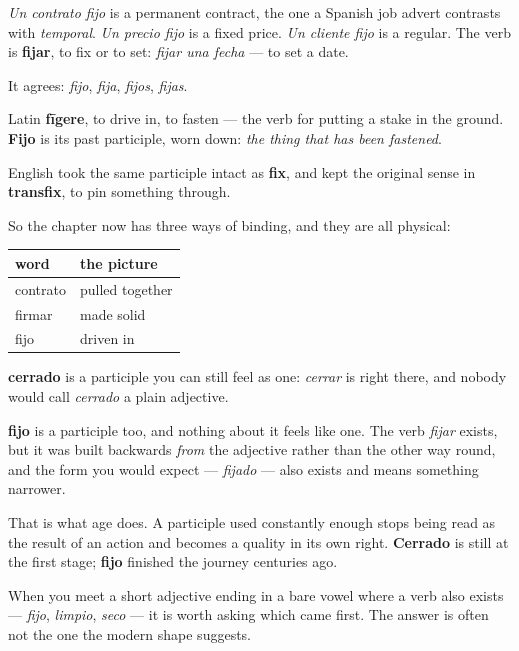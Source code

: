 \emph{Un contrato fijo} is a permanent contract, the one a Spanish job advert contrasts with \emph{temporal}. \emph{Un precio fijo} is a fixed price. \emph{Un cliente fijo} is a regular. The verb is \textbf{fijar}, to fix or to set: \emph{fijar una fecha} — to set a date.

It agrees: \emph{fijo}, \emph{fija}, \emph{fijos}, \emph{fijas}.

\begin{cousinweb}
Latin \textbf{fīgere}, to drive in, to fasten — the verb for putting a stake in the ground. \textbf{Fijo} is its past participle, worn down: \emph{the thing that has been fastened}.

English took the same participle intact as \textbf{fix}, and kept the original sense in \textbf{transfix}, to pin something through.

So the chapter now has three ways of binding, and they are all physical:

\noindent
\begin{tabularx}{\linewidth}{@{}>{\raggedright\arraybackslash}X>{\raggedright\arraybackslash}X@{}}
\toprule
\textbf{word} & \textbf{the picture} \\
\midrule
contrato & pulled together \\
firmar & made solid \\
fijo & driven in \\
\bottomrule
\end{tabularx}
\end{cousinweb}

\begin{culture}
\textbf{cerrado} is a participle you can still feel as one: \emph{cerrar} is right there, and nobody would call \emph{cerrado} a plain adjective.

\textbf{fijo} is a participle too, and nothing about it feels like one. The verb \emph{fijar} exists, but it was built backwards \emph{from} the adjective rather than the other way round, and the form you would expect — \emph{fijado} — also exists and means something narrower.

That is what age does. A participle used constantly enough stops being read as the result of an action and becomes a quality in its own right. \textbf{Cerrado} is still at the first stage; \textbf{fijo} finished the journey centuries ago.

When you meet a short adjective ending in a bare vowel where a verb also exists — \emph{fijo}, \emph{limpio}, \emph{seco} — it is worth asking which came first. The answer is often not the one the modern shape suggests.
\end{culture}


